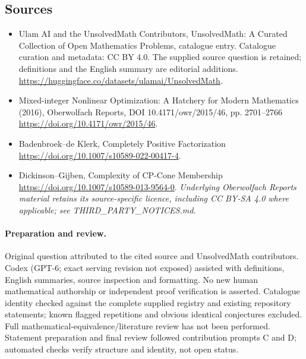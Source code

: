 \documentclass[11pt]{article}
\begin{document}
\subsection{Sources}
\begin{itemize}
\item[\hypertarget{source:statement:1}{S1}] Ulam AI and the UnsolvedMath Contributors, UnsolvedMath: A Curated Collection of Open Mathematics Problems, catalogue entry. Catalogue curation and metadata: CC BY 4.0. The supplied source question is retained; definitions and the English summary are editorial additions.
\url{https://huggingface.co/datasets/ulamai/UnsolvedMath}.
\item[\hypertarget{source:statement:2}{S2}] Mixed-integer Nonlinear Optimization: A Hatchery for Modern Mathematics (2016), Oberwolfach Reports, DOI 10.4171/owr/2015/46, pp. 2701--2766
\url{https://doi.org/10.4171/owr/2015/46}.
\item[\hypertarget{source:statement:3}{S3}] Badenbroek--de Klerk, Completely Positive Factorization
\url{https://doi.org/10.1007/s10589-022-00417-4}.
\item[\hypertarget{source:statement:4}{S4}] Dickinson--Gijben, Complexity of CP-Cone Membership
\url{https://doi.org/10.1007/s10589-013-9564-0}.
\textit{Underlying Oberwolfach Reports material retains its source-specific licence, including CC BY-SA 4.0 where applicable; see THIRD\_PARTY\_NOTICES.md.}
\end{itemize}
\paragraph{Preparation and review.}
Original question attributed to the cited source and UnsolvedMath contributors. Codex (GPT-6; exact serving revision not exposed) assisted with definitions, English summaries, source inspection and formatting. No new human mathematical authorship or independent proof verification is asserted. Catalogue identity checked against the complete supplied registry and existing repository statements; known flagged repetitions and obvious identical conjectures excluded. Full mathematical-equivalence/literature review has not been performed. Statement preparation and final review followed contribution prompts C and D; automated checks verify structure and identity, not open status.
\label{end:statement}
\end{document}

